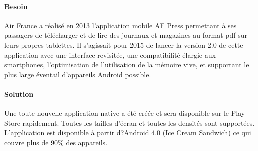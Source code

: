 \documentclass[11pt]{report}
\begin{document}
				\paragraph{Besoin\\}
				Air France a réalisé en 2013 l'application mobile AF Press permettant à ses passagers de télécharger et de lire des journaux et magazines au format pdf sur leurs propres tablettes. Il s'agissait pour 2015 de lancer la version 2.0 de cette application avec une interface revisitée, une compatibilité élargie aux smartphones, l'optimisation de l'utilisation de la mémoire vive, et supportant le plus large éventail d'appareils Android possible.

				\paragraph{Solution\\}
				Une toute nouvelle application native a été créée et sera disponible sur le Play Store rapidement. Toutes les tailles d'écran et toutes les densités sont supportées. L'application est disponible à partir d?Android 4.0 (Ice Cream Sandwich) ce qui couvre plus de 90\% des appareils.
\end{document}
